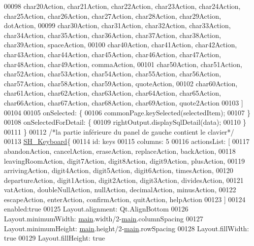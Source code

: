 \begin{DoxyCode}
00098                 char20Action, char21Action, char22Action, char23Action, char24Action, char25Action, 
      char26Action, char27Action, char28Action, char29Action, dotAction,
00099                 char30Action, char31Action, char32Action, char33Action, char34Action, char35Action, 
      char36Action, char37Action, char38Action, char39Action, spaceAction,
00100                 char40Action, char41Action, char42Action, char43Action, char44Action, char45Action, 
      char46Action, char47Action, char48Action, char49Action, commaAction,
00101                 char50Action, char51Action, char52Action, char53Action, char54Action, char55Action, 
      char56Action, char57Action, char58Action, char59Action, quoteAction,
00102                 char60Action, char61Action, char62Action, char63Action, char64Action, char65Action, 
      char66Action, char67Action, char68Action, char69Action, quote2Action
00103             ]
00104 
00105             onSelected: \{
00106                commonPage.keySelected(selectedItem);
00107             \}
00108             onSelectedForDetail: \{
00109                 rightOutput.displaySqlDetail(data);
00110             \}
00111         \}
00112         \textcolor{comment}{/*la partie inférieure du panel de gauche contient le clavier*/}
00113         \hyperlink{classSH__Keyboard}{SH\_Keyboard}\{
00114             \textcolor{keywordtype}{id}: keys
00115             columns: 5
00116             actionsList: [
00117                 abandonAction, cancelAction, eraseAction, replaceAction, backAction,
00118                 leavingRoomAction, digit7Action, digit8Action, digit9Action, plusAction,
00119                 arrivingAction, digit4Action, digit5Action, digit6Action, timesAction,
00120                 departureAction, digit1Action, digit2Action, digit3Action, dividesAction,
00121                 vatAction, doubleNullAction, nullAction, decimalAction, minusAction,
00122                 escapeAction, enterAction, confirmAction, quitAction, helpAction
00123             ]
00124             enabled:\textcolor{keyword}{true}
00125             Layout.alignment: Qt.AlignBottom
00126             Layout.minimumWidth: \hyperlink{main_8cpp_a3c04138a5bfe5d72780bb7e82a18e627}{main}.width/2-\hyperlink{main_8cpp_a3c04138a5bfe5d72780bb7e82a18e627}{main}.columnSpacing
00127             Layout.minimumHeight: \hyperlink{main_8cpp_a3c04138a5bfe5d72780bb7e82a18e627}{main}.height/2-\hyperlink{main_8cpp_a3c04138a5bfe5d72780bb7e82a18e627}{main}.rowSpacing
00128             Layout.fillWidth: \textcolor{keyword}{true}
00129             Layout.fillHeight: \textcolor{keyword}{true}

\end{DoxyCode}

